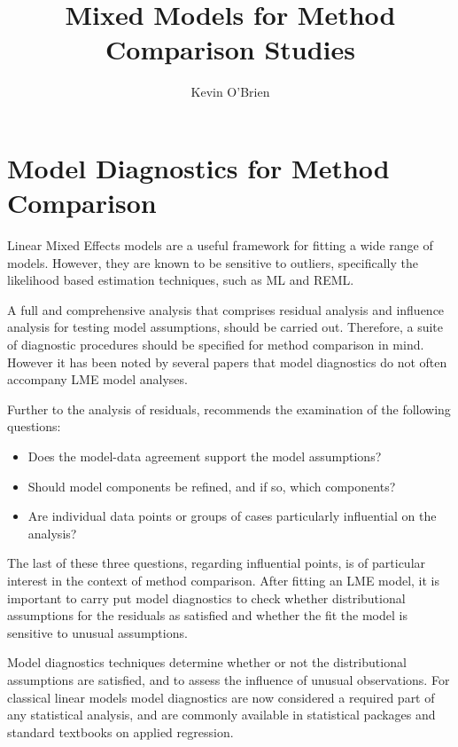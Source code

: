 \documentclass[12pt, a4paper]{report}
\author{ } \date{ }
\theoremstyle{definition}
\theoremstyle{remark}
\begin{document}
\author{Kevin O'Brien}
\title{Mixed Models for Method Comparison Studies}
\tableofcontents



\newpage
\chapter{Model Diagnostics for Method Comparison}
Linear Mixed Effects models are a useful framework for fitting a wide range of models. However, they are known to be sensitive to outliers, specifically the likelihood based estimation techniques, such as ML and REML. 

A full and comprehensive analysis that comprises residual analysis and influence analysis for testing model assumptions, should be carried out. Therefore, a suite of diagnostic procedures should be specified for method comparison in mind. However it has been noted by several papers \citep{Christensen, schabenberger} that model diagnostics do not often accompany LME model analyses. 

Further to the analysis of residuals, \citet{schabenberger} recommends the examination of the following questions:
\begin{itemize}
	\item Does the model-data agreement support the model assumptions?
	\item Should model components be refined, and if so, which components? 
	\item Are individual data points or groups of cases particularly
	influential on the analysis?
\end{itemize}
The last of these three questions, regarding influential points, is of particular interest in the context of method comparison. After fitting an LME model, it is important to carry put model diagnostics to check whether distributional assumptions for the residuals as satisfied and whether the fit the model is sensitive to unusual assumptions. 


Model diagnostics techniques determine whether or not the distributional assumptions are satisfied, and to assess the influence of unusual observations. For classical linear models model diagnostics are now considered a required part of any statistical analysis, and are commonly available in statistical packages and standard textbooks on applied regression.
\end{document}
